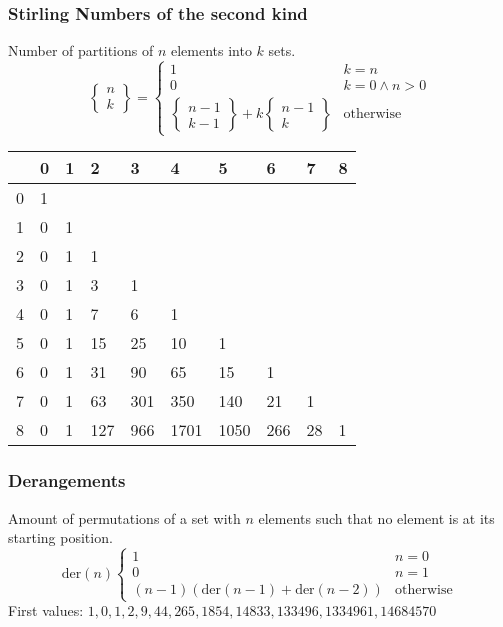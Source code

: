 \subsubsection{Stirling Numbers of the second kind}

Number of partitions of $n$ elements into $k$ sets.
\begin{equation*}
  \begin{Bmatrix}
    n\\k
  \end{Bmatrix} =
  \begin{cases}
    1 & k = n\\
    0 & k = 0 \land n > 0 \\
    \left\{
      \begin{smallmatrix}
        n - 1\\k - 1
      \end{smallmatrix}
\right\} + k \left\{
  \begin{smallmatrix}
    n - 1\\k
  \end{smallmatrix}
\right\} & \text{otherwise}
  \end{cases}
\end{equation*}
\begin{center}
	\begin{tabular}{ |l||l|l|l|l|l|l|l|l|l| } 
		\hline
		\diagbox{$n$}{$k$} & 0 & 1 & 2 & 3 & 4 & 5 & 6 & 7  & 8 \\
		\hline\hline
		0 & 1 &      & & & & & & & \\
		1 & 0 &  1 &     &     &      &      &     &     &  \\
		2 & 0 &  1 & 1   &     &      &      &     &     &  \\
		3 & 0 & 1 & 3   & 1   &      &      &     &     &  \\
		4 & 0 &  1 & 7   & 6   & 1    &      &     &     &  \\
		5 & 0 &  1 & 15  & 25  & 10   & 1    &     &     &  \\
		6 & 0 &  1 & 31  & 90  & 65   & 15   & 1   &     &  \\
		7 & 0 &  1 & 63  & 301 & 350  & 140  & 21  & 1   &  \\
		8 & 0 &  1 & 127 & 966 & 1701 & 1050 & 266 & 28 & 1 \\
		\hline
	\end{tabular}
\end{center}

\subsubsection{Derangements}
Amount of permutations of a set with $n$ elements such that no element
is at its starting position.
\begin{equation*}
  \text{der}(n)
  \begin{cases}
    1 & n = 0\\
    0 & n = 1\\
    (n - 1)(\text{der}(n - 1) + \text{der}(n - 2)) & \text{otherwise}
  \end{cases}
\end{equation*}
First values: $1, 0, 1, 2, 9, 44, 265, 1854, 14833, 133496, 1334961, 14684570$

